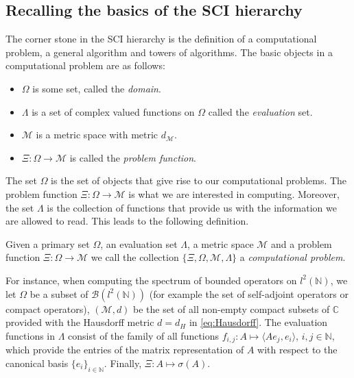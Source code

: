 \documentclass[a4paper,10pt]{article}
\begin{document}
\subsection{Recalling the basics of the SCI hierarchy}\label{SCI_basics}
The corner stone in the SCI hierarchy is the definition of a computational problem, a general algorithm and towers of algorithms. 
The basic objects in a computational problem are as follows:
\begin{itemize}
\itemsep0em
\item[(i)] $\Omega$ is some set, called the \emph{domain}.
\item[(ii)] $\Lambda$ is a set of complex valued functions on $\Omega$ called the \emph{evaluation} set.
\item[(iii)] $\mathcal{M}$ is a metric space with metric $d_{\mathcal{M}}$.
\item[(iv)] $\Xi:\Omega\to \mathcal{M}$ is called the \emph{problem function}.
\end{itemize}
The set $\Omega$ is the set of objects that give rise to our computational problems. The problem function $\Xi : \Omega\to \mathcal{M}$ is what we are interested in computing. Moreover, the set $\Lambda$ is the collection of functions that provide us with the information we are allowed to read. This leads to the following definition.

\begin{definition}
Given a primary set $\Omega$, an evaluation set $\Lambda$, a metric space $\mathcal{M}$ and a problem function $\Xi:\Omega\to \mathcal{M}$ we call the collection $\{\Xi,\Omega,\mathcal{M},\Lambda\}$ a \emph{computational problem}.
\end{definition}


For instance, when computing the spectrum of bounded operators on $l^2(\mathbb{N})$, we let 
$\Omega$ be a subset of $\mathcal{B}(l^2(\mathbb{N}))$ (for example the set of self-adjoint operators or compact operators), $(\mathcal{M},d)$ be the set of all non-empty compact subsets of $\mathbb{C}$ provided with the Hausdorff metric $d=d_{H}$ in 
\eqref{eq:Hausdorff}. The evaluation functions in $\Lambda$ consist of the family of all functions $f_{i,j}: A\mapsto \langle Ae_j,e_i\rangle$, $i,j\in\mathbb{N}$, which provide the entries of the matrix representation of $A$ with respect to the canonical basis $\{e_i\}_{i\in \mathbb{N}}$. Finally, $\Xi: A \mapsto \sigma(A)$.
\end{document}
